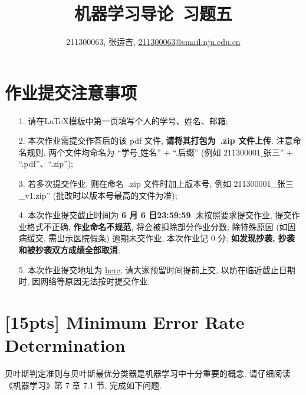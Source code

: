 \documentclass[a4paper,UTF8]{article}
\numberwithin{equation}{section}
\theoremstyle{definition}
\begin{document}
\title{机器学习导论\ 习题五}
\author{211300063, 张运吉, \href{mailto:邮箱}{211300063@smail.nju.edu.cn}}
\maketitle
\section*{作业提交注意事项}
\begin{tcolorbox}
	\begin{enumerate}
		\item[1.] 请在LaTeX模板中第一页填写个人的学号、姓名、邮箱;
		\item[2.] 本次作业需提交作答后的该 pdf 文件, {\color{red}\textbf{请将其打包为~.zip 文件上传}}. 注意命名规则, 两个文件均命名为 “$\text{学号}\_\text{姓名}$” + “.后缀” (例如 $\text{211300001}\_\text{张三}$” + “.pdf”、“.zip”);
		\item[3.] 若多次提交作业, 则在命名~.zip 文件时加上版本号, 例如 211300001\_张三\_v1.zip” (批改时以版本号最高的文件为准);
		\item[4.] 本次作业提交截止时间为 {\color{red}\textbf{ 6 月 6 日23:59:59}}. 未按照要求提交作业, 提交作业格式不正确, {\color{red}\textbf{作业命名不规范}}, 将会被扣除部分作业分数; 除特殊原因 (如因病缓交, 需出示医院假条) 逾期未交作业, 本次作业记 0 分; {\color{red}\textbf{如发现抄袭, 抄袭和被抄袭双方成绩全部取消}};
		\item[5.] 本次作业提交地址为 \href{https://box.nju.edu.cn/u/d/c3a4ff4dc42744d48541/}{here}, 请大家预留时间提前上交, 以防在临近截止日期时, 因网络等原因无法按时提交作业.
	\end{enumerate}
\end{tcolorbox}

\newpage

\section{[15pts] Minimum Error Rate Determination}
贝叶斯判定准则与贝叶斯最优分类器是机器学习中十分重要的概念. 请仔细阅读《机器学习》第 7 章 7.1 节, 完成如下问题.
\end{document}
